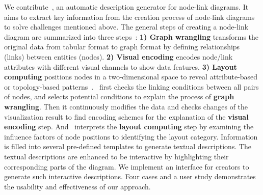 


We contribute~\textit{\ApproachName}, an automatic description generator for node-link diagrams.
It aims to extract key information from the creation process of node-link diagrams to solve challenges mentioned above.
The general steps of creating a node-link diagram are summarized into three steps~\cite{DBLP:journals/cgf/SpritzerBDFF15, tvcg/RomatAP21}:
\nointent \textbf{1) Graph wrangling} transforms the original data from tabular format to graph format by defining relationships (links) between entities (nodes).
\nointent \textbf{2) Visual encoding} encodes node/link attributes with different visual channels to show data features. 
\nointent \textbf{3) Layout computing} positions nodes in a two-dimensional space to reveal attribute-based or topology-based patterns~\cite{DBLP:journals/cgf/NobreMSL19}.
\ApproachName~first checks the linking conditions between all pairs of nodes, and selects potential conditions to explain the process of \textbf{graph wrangling}.
Then it continuously modifies the data and checks changes of the visualization result to find encoding schemes for the explanation of the \textbf{visual encoding} step.
And \ApproachName~interprets the \textbf{layout computing} step by examining the influence factors of node positions to identifying the layout category.
Information is filled into several pre-defined templates to generate textual descriptions.
The textual descriptions are enhanced to be interactive by highlighting their corresponding parts of the diagram.
We implement an interface for creators to generate such interactive descriptions.
Four cases and a user study demonstrates the usability and effectiveness of our approach.


